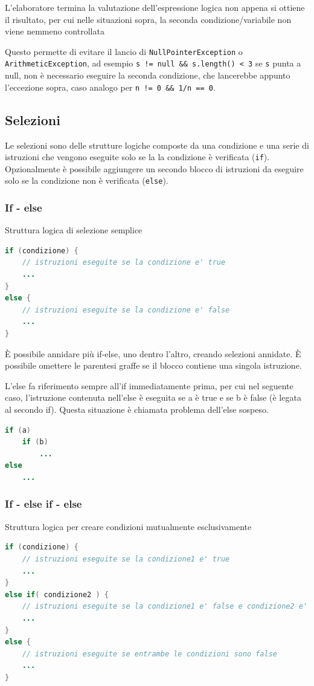 \documentclass{article}
\begin{document}
L'elaboratore termina la valutazione dell'espressione logica non appena si ottiene il risultato, per cui nelle situazioni sopra,
la seconda condizione/variabile non viene nemmeno controllata

Questo permette di evitare il lancio di \verb|NullPointerException| o \verb|ArithmeticException|, ad esempio \verb|s != null && s.length() < 3|
se \verb|s| punta a null, non è necessario eseguire la seconda condizione, che lancerebbe appunto l'eccezione sopra, caso analogo per \verb|n != 0 && 1/n == 0|.

\newpage


\subsection{Selezioni}
Le selezioni sono delle strutture logiche composte da una condizione e una serie di istruzioni che vengono eseguite solo se la
la condizione è verificata (\verb|if|). Opzionalmente è possibile aggiungere un secondo blocco di istruzioni da eseguire solo
se la condizione non è verificata (\verb|else|).

\subsubsection*{If - else}
Struttura logica di selezione semplice
\begin{lstlisting}[language=Java]
if (condizione) {
	// istruzioni eseguite se la condizione e' true
	...
}
else {
	// istruzioni eseguite se la condizione e' false
	...
}
\end{lstlisting}
È possibile annidare più if-else, uno dentro l'altro, creando selezioni annidate. È possibile omettere le parentesi graffe se il
blocco contiene una singola istruzione.

L'else fa riferimento sempre all'if immediatamente prima, per cui nel seguente caso, l'istruzione contenuta nell'else è eseguita
se a è true e se b è false (è legata al secondo if). Questa situazione è chiamata problema dell'else sospeso.
\begin{lstlisting}[language=Java]
if (a)
	if (b)
		...
else
	...
\end{lstlisting}

\subsubsection*{If - else if - else}
Struttura logica per creare condizioni mutualmente esclusivamente
\begin{lstlisting}[language=Java]
if (condizione) {
	// istruzioni eseguite se la condizione1 e' true
	...
}
else if( condizione2 ) {
	// istruzioni eseguite se la condizione1 e' false e condizione2 e' true
	...
}
else {
	// istruzioni eseguite se entrambe le condizioni sono false
	...
}
\end{lstlisting}
\end{document}
